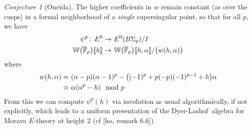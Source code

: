 \documentclass{rs}
\theoremstyle{definition}
\theoremstyle{remark}
\newtheorem{conj}[thm]{Conjecture}
\def\co{\colon\thinspace}
\newcommand{\mb}[1]{\mathbb{#1}}
\newcommand{\cF}{\overline {\mb F}}
\newcommand{\DL}{Dyer-Lashof~}
\newcommand{\BW}{{\mb W}}
\newcommand{\md}{~~{\rm mod}~}
\newcommand{\A}{\alpha}
\newcommand{\lb}{\llbracket}
\newcommand{\rb}{\rrbracket}
\renewcommand{\=}{\approx}
\renewcommand{\-}{\sim}
\numberwithin{equation}{section}
\numberwithin{thm}{section}
\begin{document}
\begin{conj}[Oneida]
 The higher coefficients in $w$ remain constant (as over the cusps) 
 in a formal neighborhood of a {\em single} supersingular point, 
 so that for all $p$, we have 
 \begin{equation*}
  \begin{split}
                \psi^p \co E^0 \to & ~ E^0(B\Sigma_p) / I \\
   \BW\big(\cF_p\big)\lb h \rb \to & ~ \BW\big(\cF_p\big)\lb h, \A \rb / \big(w(h,\A)\big) 
  \end{split}
 \end{equation*}
 where 
 \begin{equation*}
  \begin{split}
   w(h,\A) = & ~ (\A - p) (\A - 1)^p - \big((-1)^p + p (-p) (-1)^{p - 1} + h\big) \A \\
      \equiv & ~ \A (\A^p - h) \md p 
  \end{split}
 \end{equation*}
 From this we can compute $\psi^p(h)$ via involution as usual algorithmically, if not explicitly, 
 which leads to a uniform presentation of the \DL algebra for Morava $E$-theory at height 2 (cf [ho, remark 6.6]).  
\end{conj}
\end{document}
